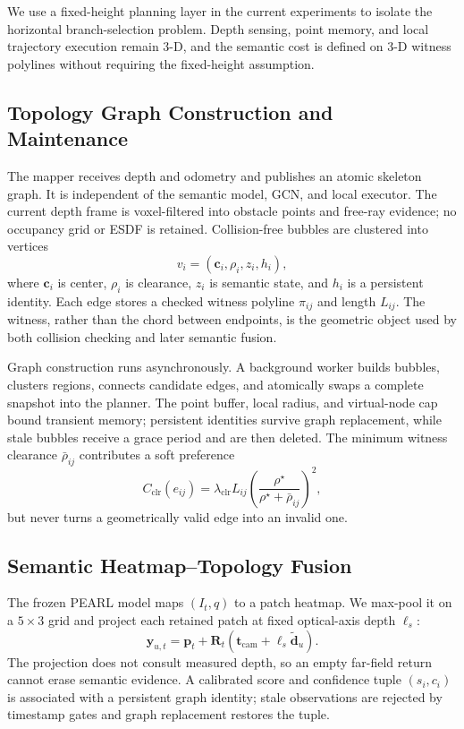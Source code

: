 \documentclass[letterpaper,10pt,conference]{ieeeconf}
\newcommand{\vect}[1]{\boldsymbol{#1}}
\newcommand{\mat}[1]{\mathbf{#1}}
\begin{document}
We use a fixed-height planning layer in the current experiments to isolate
the horizontal branch-selection problem.  Depth sensing, point memory, and
local trajectory execution remain 3-D, and the semantic cost is defined on
3-D witness polylines without requiring the fixed-height assumption.

\subsection{Topology Graph Construction and Maintenance}
\label{sec:topology}
The mapper receives depth and odometry and publishes an atomic skeleton graph.
It is independent of the semantic model, GCN, and local executor.  The current
depth frame is voxel-filtered into obstacle points and free-ray evidence; no
occupancy grid or ESDF is retained.  Collision-free bubbles are clustered into
vertices
\begin{equation}
 v_i=(\vect{c}_i,\rho_i,z_i,h_i),
\end{equation}
where $\vect{c}_i$ is center, $\rho_i$ is clearance, $z_i$ is semantic state,
and $h_i$ is a persistent identity.  Each edge stores a checked witness
polyline $\pi_{ij}$ and length $L_{ij}$.  The witness, rather than the chord
between endpoints, is the geometric object used by both collision checking
and later semantic fusion.

Graph construction runs asynchronously.  A background worker builds bubbles,
clusters regions, connects candidate edges, and atomically swaps a complete
snapshot into the planner.  The point buffer, local radius, and virtual-node
cap bound transient memory; persistent identities survive graph replacement,
while stale bubbles receive a grace period and are then deleted.  The minimum
witness clearance $\bar\rho_{ij}$ contributes a soft preference
\begin{equation}
 C_{\mathrm{clr}}(e_{ij})=
 \lambda_{\mathrm{clr}}L_{ij}
 \left(\frac{\rho^\star}{\rho^\star+\bar\rho_{ij}}\right)^2,
\label{eq:clearance}
\end{equation}
but never turns a geometrically valid edge into an invalid one.
\subsection{Semantic Heatmap--Topology Fusion}
\label{sec:semantics}
The frozen PEARL model maps $(I_t,q)$ to a patch heatmap.  We max-pool it on
a $5\times3$ grid and project each retained patch at fixed optical-axis depth
$\ell_s$:
\begin{equation}
 \vect{y}_{u,t}=\vect{p}_t+\mat{R}_t
 \left(\vect{t}_{\mathrm{cam}}+\ell_s\widetilde{\vect{d}}_u\right).
\label{eq:projection}
\end{equation}
The projection does not consult measured depth, so an empty far-field return
cannot erase semantic evidence.  A calibrated score and confidence tuple
$(s_i,c_i)$ is associated with a persistent graph identity; stale observations
are rejected by timestamp gates and graph replacement restores the tuple.
\end{document}
